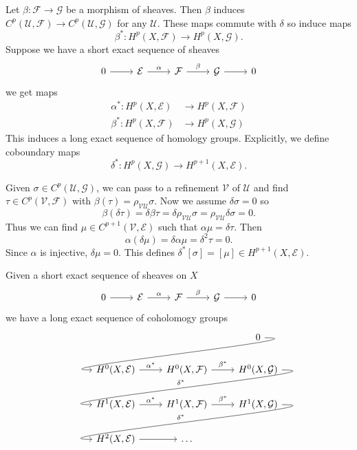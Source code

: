 \documentclass[a4paper]{article}
\begin{document}
Let \(\beta: \mathcal F \to \mathcal G\) be a morphism of sheaves. Then \(\beta\) induces \(C^p(\mathcal U, \mathcal F) \to C^p(\mathcal U, \mathcal G)\) for any \(\mathcal U\). These maps commute with \(\delta\) so induce maps
\[
  \beta^*: H^p(X, \mathcal F) \to H^p(X, \mathcal G).
\]
Suppose we have a short exact sequence of sheaves
\[
  \begin{tikzcd}
    0 \ar[r] & \mathcal E \ar[r, "\alpha"] & \mathcal F \ar[r, "\beta"] & \mathcal G \ar[r] & 0
  \end{tikzcd}
\]
we get maps
\begin{align*}
  \alpha^*: H^p(X, \mathcal E) &\to H^p(X, \mathcal F) \\
  \beta^*: H^p(X, \mathcal F) &\to H^p(X, \mathcal G)
\end{align*}
This induces a long exact sequence of homology groups. Explicitly, we define coboundary maps
\[
  \delta^*: H^p(X, \mathcal G) \to H^{p + 1}(X, \mathcal E).
\]

Given \(\sigma \in C^p(\mathcal U, \mathcal G)\), we can pass to a refinement \(\mathcal V\) of \(\mathcal U\) and find \(\tau \in C^p(\mathcal V, \mathcal F)\) with \(\beta(\tau) = \rho_{\mathcal V \mathcal U} \sigma\). Now we assume \(\delta \sigma = 0\) so
\[
  \beta(\delta \tau)
  = \delta \beta \tau
  = \delta \rho_{\mathcal V \mathcal U} \sigma
  = \rho_{\mathcal V \mathcal U} \delta \sigma
  = 0.
\]
Thus we can find \(\mu \in C^{p + 1}(\mathcal V, \mathcal E)\) such that \(\alpha \mu = \delta \tau\). Then
\[
  \alpha(\delta \mu) = \delta \alpha \mu = \delta^2 \tau = 0.
\]
Since \(\alpha\) is injective, \(\delta \mu = 0\). This defines \(\delta^*[\sigma] = [\mu] \in H^{p + 1}(X, \mathcal E)\).

\begin{theorem}
  Given a short exact sequence of sheaves on \(X\)
  \[
    \begin{tikzcd}
      0 \ar[r] & \mathcal E \ar[r, "\alpha"] & \mathcal F \ar[r, "\beta"] & \mathcal G \ar[r] & 0
    \end{tikzcd}
  \]
  we have a long exact sequence of coholomogy groups
  \[
    \begin{tikzcd}
      & & 0 \ar[dll, out=0, in=180] \\
      H^0(X, \mathcal E) \ar[r, "\alpha^*"] & H^0(X, \mathcal F) \ar[r, "\beta^*"] & H^0(X, \mathcal G) \ar[dll, "\delta^*"', out=0, in=180, overlay] \\
      H^1(X, \mathcal E) \ar[r, "\alpha^*"] & H^1(X, \mathcal F) \ar[r, "\beta^*"] & H^1(X, \mathcal G) \ar[dll, "\delta^*"', out=0, in=180, overlay] \\
      H^2(X, \mathcal E) \ar[r] & \dots
    \end{tikzcd}
  \]
\end{theorem}
\end{document}
